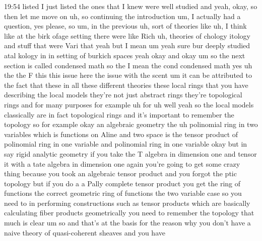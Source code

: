 \begin{unfinished}{19:54}
 listed I just listed the ones that I knew were well studied and yeah, okay, so then let me move on uh, so continuing the introduction um, I actually had a question, yes please, so um, in the previous uh, sort of theories like uh, I think like at the birk ofage setting there were like Rich uh, theories of chology itology and stuff that were Vari that yeah but I mean um yeah sure bur deeply studied atal kology in in setting of burkich spaces yeah okay and okay um so the next section is called condensed math so the I mean the cond condensed math yes uh the the F this this issue here the issue with the scent um it can be attributed to the fact that these in all these different theories these local rings that you have describing the local models they're not just abstract rings they're topological rings and for many purposes for example uh for uh well yeah so the local models classically are in fact topological rings and it's important to remember the topology so for example okay an algebraic geometry the uh polinomial ring in two variables which is functions on Aline and two space is the tensor product of polinomial ring in one variable and polinomial ring in one variable okay but in say rigid analytic geometry if you take the T algebra in dimension one and tensor it with a tate algebra in dimension one again you're going to get some crazy thing because you took an algebraic tensor product and you forgot the ptic topology but if you do a a Pally complete tensor product you get the ring of functions the correct geometric ring of functions the two variable case so you need to in performing constructions such as tensor products which are basically calculating fiber products geometrically you need to remember the topology that much is clear um so and that's at the basis for the reason why you don't have a naive theory of quasi-coherent sheaves and you have


\end{unfinished}

